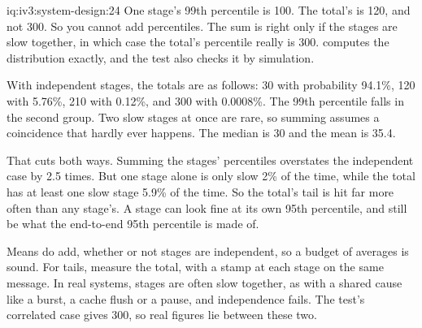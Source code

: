 \begin{solution}{iq:iv3:system-design:24}
One stage's 99th percentile is 100. The total's is 120, and not 300. So you cannot add percentiles. The sum is right only if the stages are slow together, in which case the total's percentile really is 300.  computes the distribution exactly, and the test also checks it by simulation.
\label{lst:iv3:sd:budget}

With independent stages, the totals are as follows: 30 with probability 94.1\%, 120 with 5.76\%, 210 with 0.12\%, and 300 with 0.0008\%. The 99th percentile falls in the second group. Two slow stages at once are rare, so summing assumes a coincidence that hardly ever happens. The median is 30 and the mean is 35.4.

That cuts both ways. Summing the stages' percentiles overstates the independent case by 2.5 times. But one stage alone is only slow 2\% of the time, while the total has at least one slow stage 5.9\% of the time. So the total's tail is hit far more often than any stage's. A stage can look fine at its own 95th percentile, and still be what the end-to-end 95th percentile is made of.

Means do add, whether or not stages are independent, so a budget of averages is sound. For tails, measure the total, with a stamp at each stage on the same message. In real systems, stages are often slow together, as with a shared cause like a burst, a cache flush or a pause, and independence fails. The test's correlated case gives 300, so real figures lie between these two.

\end{solution}

